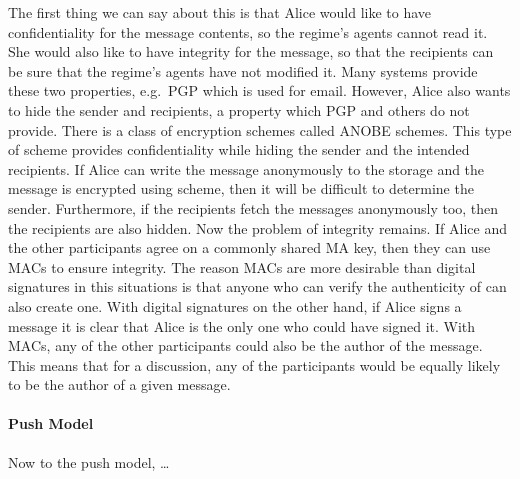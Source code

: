 The first thing we can say about this is that Alice would like to have 
confidentiality for the message contents, so the regime's agents cannot read 
it.
She would also like to have integrity for the message, so that the recipients 
can be sure that the regime's agents have not modified it.
Many systems provide these two properties, e.g.\ \ac{PGP} which is used for 
email.
However, Alice also wants to hide the sender and recipients, a property which 
\ac{PGP} and others do not provide.
There is a class of encryption schemes called \ac{ANOBE} schemes.
This type of scheme provides confidentiality while hiding the sender and the 
intended recipients.
If Alice can write the message anonymously to the storage and the message is 
encrypted using  scheme, then it will be difficult to determine the 
sender.
Furthermore, if the recipients fetch the messages anonymously too, then the 
recipients are also hidden.
Now the problem of integrity remains.
If Alice and the other participants agree on a commonly shared \ac{MA} key, 
then they can use \acp{MAC} to ensure integrity.
The reason \acp{MAC} are more desirable than digital signatures in this 
situations is that anyone who can verify the authenticity of  can also 
create one.
With digital signatures on the other hand, if Alice signs a message it is clear 
that Alice is the only one who could have signed it.
With \acp{MAC}, any of the other participants could also be the author of the 
message.
This means that for a discussion, any of the participants would be equally 
likely to be the author of a given message.

\paragraph{Push Model}
Now to the push model, \dots
